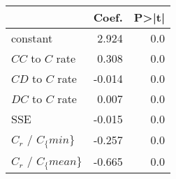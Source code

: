 \begin{tabular}{lrr}
\toprule
{} &  Coef. &  P>|t| \\
\midrule
constant           &  2.924 &    0.0 \\
$CC$ to $C$ rate   &  0.308 &    0.0 \\
$CD$ to $C$ rate   & -0.014 &    0.0 \\
$DC$ to $C$ rate   &  0.007 &    0.0 \\
SSE                & -0.015 &    0.0 \\
$C_r$ / $C_\{min\}$  & -0.257 &    0.0 \\
$C_r$ / $C_\{mean\}$ & -0.665 &    0.0 \\
\bottomrule
\end{tabular}
